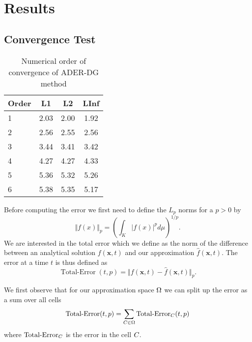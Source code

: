\chapter{Results}\label{chap:results}
\section{Convergence Test}
\begin{table}[htb]
  \centering
\caption{Numerical order of convergence of ADER-DG method}%
\label{tab:convergence-order}
\begin{tabular}{@{}lS[table-format=1.2]S[table-format=1.2]S[table-format=1.2]@{}}
\toprule
{Order} & {L1} & {L2} & {LInf}\\  & 2.03 & 2.00 & 1.92\\
2 & 2.56 & 2.55 & 2.56\\
3 & 3.44 & 3.41 & 3.42\\
4 & 4.27 & 4.27 & 4.33\\
5 & 5.36 & 5.32 & 5.26\\
6 & 5.38 & 5.35 & 5.17\\
\bottomrule
\end{tabular}
\end{table}
\newcommand{\error}{\operatorname{Total-Error}}

Before computing the error we first need to define the $L_p$ norms for a $p > 0$ by
\begin{equation}
  \label{eq:Lp-nrom}
  \Vert f(x) \Vert_p = \left( \int_K \vert f(x) \vert^p d\mu  \right)^{1/p}.
\end{equation}
We are interested in the total error which we define as the norm of the difference between an analytical solution $f(\bm{x}, t)$ and our approximation $\hat{f}(\bm{x}, t)$.
The error at a time $t$ is thus defined as
\begin{equation}
  \label{eq:error}
  \error(t,p) = \Vert f(\bm{x}, t) - \hat{f}(\bm{x}, t) \Vert_p.
\end{equation}

We first observe that for our approximation space $\broken$ we can split up the error as a sum over all cells
\begin{equation}
  \label{eq:lp-norm-broken}
  \error(t,p) = \sum_{\cell[] \in \broken} \error_{\cell[]}(t,p)
\end{equation}
where $\error_{\cell[]}$ is the error in the cell $\cell[]$.

